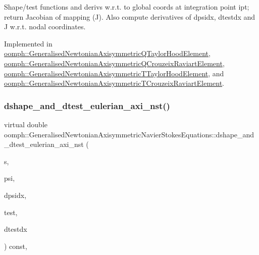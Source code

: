 Shape/test functions and derivs w.\+r.\+t. to global coords at integration point ipt; return Jacobian of mapping (J). Also compute derivatives of dpsidx, dtestdx and J w.\+r.\+t. nodal coordinates. 



Implemented in \hyperlink{classoomph_1_1GeneralisedNewtonianAxisymmetricQTaylorHoodElement_a2db89147bd02f6f037b9f602758dc539}{oomph\+::\+Generalised\+Newtonian\+Axisymmetric\+Q\+Taylor\+Hood\+Element}, \hyperlink{classoomph_1_1GeneralisedNewtonianAxisymmetricQCrouzeixRaviartElement_a5af9d208617374ffc4b0b7a9af35deaf}{oomph\+::\+Generalised\+Newtonian\+Axisymmetric\+Q\+Crouzeix\+Raviart\+Element}, \hyperlink{classoomph_1_1GeneralisedNewtonianAxisymmetricTTaylorHoodElement_a9e65234ae86b30a0b2fd82d5495033c5}{oomph\+::\+Generalised\+Newtonian\+Axisymmetric\+T\+Taylor\+Hood\+Element}, and \hyperlink{classoomph_1_1GeneralisedNewtonianAxisymmetricTCrouzeixRaviartElement_aa0b53fa6fea4f83b0e4828f83804d11e}{oomph\+::\+Generalised\+Newtonian\+Axisymmetric\+T\+Crouzeix\+Raviart\+Element}.

\mbox{\label{classoomph_1_1GeneralisedNewtonianAxisymmetricNavierStokesEquations_a9321e8563cb2dfec9824024008a6914e}} 
\subsubsection{\texorpdfstring{dshape\+\_\+and\+\_\+dtest\+\_\+eulerian\+\_\+axi\+\_\+nst()}{dshape\_and\_dtest\_eulerian\_axi\_nst()}}
{\footnotesize\ttfamily virtual double oomph\+::\+Generalised\+Newtonian\+Axisymmetric\+Navier\+Stokes\+Equations\+::dshape\+\_\+and\+\_\+dtest\+\_\+eulerian\+\_\+axi\+\_\+nst (\begin{DoxyParamCaption}\item[{const \hyperlink{classoomph_1_1Vector}{Vector}$<$ double $>$ \&}]{s,  }\item[{\hyperlink{classoomph_1_1Shape}{Shape} \&}]{psi,  }\item[{\hyperlink{classoomph_1_1DShape}{D\+Shape} \&}]{dpsidx,  }\item[{\hyperlink{classoomph_1_1Shape}{Shape} \&}]{test,  }\item[{\hyperlink{classoomph_1_1DShape}{D\+Shape} \&}]{dtestdx }\end{DoxyParamCaption}) const\hspace{0.3cm}{\ttfamily [protected]}, {}}



